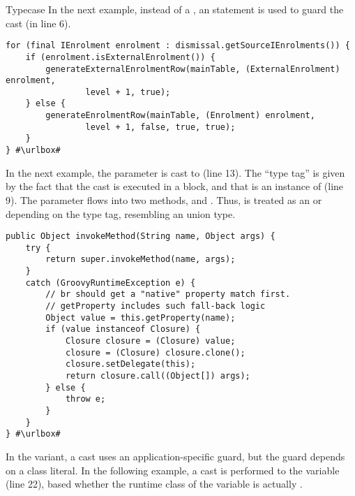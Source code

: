 \begin{pattern}{Typecase}
In the next example, instead of a ,
an  statement is used to guard the cast (in line 6).

\def\urlvar{http://bit.ly/FenixEdu_fenixedu_academic_2SUNOUJ}
\begin{verbatim}
for (final IEnrolment enrolment : dismissal.getSourceIEnrolments()) {
    if (enrolment.isExternalEnrolment()) {
        generateExternalEnrolmentRow(mainTable, (ExternalEnrolment) enrolment,
                level + 1, true);
    } else {
        generateEnrolmentRow(mainTable, (Enrolment) enrolment,
                level + 1, false, true, true);
    }
} #\urlbox#
\end{verbatim}

In the next example,
the parameter  is cast to  (line 13).
The ``type tag'' is given by the fact that the cast is executed in a  block,
and that  is an instance of  (line 9).
The  parameter flows into two methods,
 and
.
Thus,  is treated as an  or  depending on the type tag, resembling an union type.

\def\urlvar{http://bit.ly/groovy_groovy_core_2SGzK16}
\begin{verbatim}
public Object invokeMethod(String name, Object args) {
    try {
        return super.invokeMethod(name, args);
    }
    catch (GroovyRuntimeException e) {
        // br should get a "native" property match first.
        // getProperty includes such fall-back logic
        Object value = this.getProperty(name);
        if (value instanceof Closure) {
            Closure closure = (Closure) value;
            closure = (Closure) closure.clone();
            closure.setDelegate(this);
            return closure.call((Object[]) args);
        } else {
            throw e;
        }
    }
} #\urlbox#
\end{verbatim}

In the  variant, a cast uses an application-specific guard, but the guard depends on a class literal.
In the following example,
a cast is performed to the  variable (line 22),
based whether the runtime class of the variable is actually .


\end{pattern}
